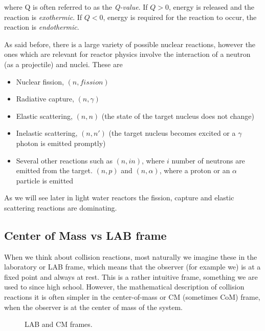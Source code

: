 where Q is often referred to as the \textit{Q-value}. If $Q>0$, energy is released and the reaction is \textit{exothermic}. If $Q<0$, energy is required for the reaction to occur, the reaction is \textit{endothermic}.

As said before, there is a large variety of possible nuclear reactions, however the ones which are relevant for reactor physics involve the interaction of a neutron (as a projectile) and nuclei. These are

\begin{itemize}
\item Nuclear fission, $(n,fission)$
\item Radiative capture, $(n,\gamma)$
\item Elastic scattering, $(n,n)$ (the state of the target nucleus does not change)
\item Inelastic scattering, $(n,n')$ (the target nucleus becomes excited or a $\gamma$ photon is emitted promptly)
\item Several other reactions such as $(n,\textit{i}n)$, where $i$ number of neutrons are emitted from the target. $(n,p)$ and $(n,\alpha)$, where a proton or an $\alpha$ particle is emitted
\end{itemize}

As we will see later in light water reactors the fission, capture and elastic scattering reactions are dominating.

\subsection{Center of Mass vs LAB frame}

When we think about collision reactions, most naturally we imagine these in the laboratory or LAB frame, which means that the observer (for example we) is at a fixed point and always at rest. This is a rather intuitive frame, something we are used to since high school. However, the mathematical description of collision reactions it is often simpler in the center-of-mass or CM (sometimes CoM) frame, when the observer is at the center of mass of the system. 

\begin{figure}[ht!]
\protect {}\protect
\caption{\label{fig:LABCM} \footnotesize{LAB and CM frames.}}
\end{figure}

